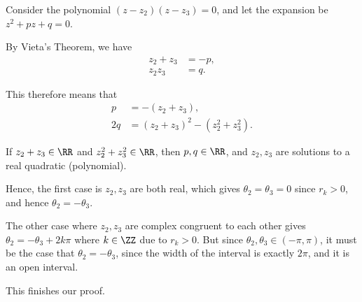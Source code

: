 \begin{enumerate}
          Consider the polynomial \((z - z_2)(z - z_3) = 0\), and let the expansion be \(z^2 + pz + q = 0\).

          By Vieta's Theorem, we have
          \begin{align*}
              z_2 + z_3 & = -p, \\
              z_2 z_3   & = q.
          \end{align*}

          This therefore means that
          \begin{align*}
              p  & = - (z_2 + z_3),                   \\
              2q & = (z_2 + z_3)^2 - (z_2^2 + z_3^2).
          \end{align*}

          If \(z_2 + z_3 \in \RR\) and \(z_2^2 + z_3^2 \in \RR\), then \(p, q \in \RR\), and \(z_2, z_3\) are solutions to a real quadratic (polynomial).

          Hence, the first case is \(z_2, z_3\) are both real, which gives \(\theta_2 = \theta_3 = 0\) since \(r_k > 0\), and hence \(\theta_2 = -\theta_3\).

          The other case where \(z_2, z_3\) are complex congruent to each other gives \(\theta_2 = - \theta_3 + 2k\pi\) where \(k \in \ZZ\) due to \(r_k > 0\). But since \(\theta_2, \theta_3 \in (-\pi, \pi)\), it must be the case that \(\theta_2 = -\theta_3\), since the width of the interval is exactly \(2\pi\), and it is an open interval.

          This finishes our proof.
\end{enumerate}